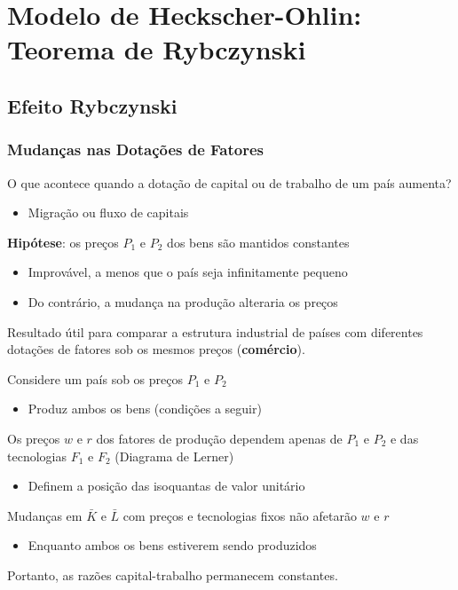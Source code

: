 \documentclass[a4paper,12pt]{article}[abntex2]
\begin{document}
\newpage
\section{\textbf{Modelo de Heckscher-Ohlin: Teorema de Rybczynski}}
\subsection{\textbf{Efeito Rybczynski}}
\subsubsection{\textbf{Mudanças nas Dotações de Fatores}}
O que acontece quando a dotação de capital ou de trabalho de um país aumenta?\begin{itemize}
    \item Migração ou fluxo de capitais
\end{itemize}

\textbf{Hipótese}: os preços $P_1$ e $P_2$ dos bens são mantidos constantes
\begin{itemize}
    \item Improvável, a menos que o país seja infinitamente pequeno
    \item Do contrário, a mudança na produção alteraria os preços
\end{itemize}

Resultado útil para comparar a estrutura industrial de países com diferentes dotações de fatores sob os mesmos preços (\textbf{comércio}).

Considere um país sob os preços $P_1$ e $P_2$
\begin{itemize}
    \item Produz ambos os bens (condições a seguir)
\end{itemize}

Os preços $w$ e $r$ dos fatores de produção dependem apenas de $P_1$ e $P_2$ e das tecnologias $F_1$ e $F_2$ (Diagrama de Lerner)
\begin{itemize}
    \item Definem a posição das isoquantas de valor unitário
\end{itemize}

Mudanças em $\bar{K}$ e $\bar{L}$ com preços e tecnologias fixos não afetarão $w$ e $r$
\begin{itemize}
    \item Enquanto ambos os bens estiverem sendo produzidos
\end{itemize}

Portanto, as razões capital-trabalho permanecem constantes.
\end{document}
